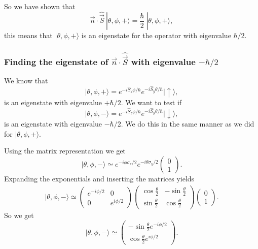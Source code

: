 \documentclass[a4paper, 11pt, titlepage, english]{article}
\newcommand{\ket}[1]{|#1 \rangle}
\newcommand{\op}[1]{\hat{#1}}
\newcommand{\up}{\left|\uparrow\rangle\right.}
\newcommand{\down}{\left|\downarrow\rangle\right.}
\begin{document}
So we have shown that
$$\vec{n}\cdot\op{\vec{S}} \ \ket{\theta, \phi, +} = \frac{\hbar}{2} \ \ket{\theta, \phi, +}, $$
this means that $\ket{\theta, \phi, +}$ is an eigenstate for the operator with eigenvalue $\hbar/2$.

\clearpage
\subsubsection*{Finding the eigenstate of $\vec{n}\cdot\op{\vec{S}}$ with eigenvalue $-\hbar/2$}
We know that 
$$\ket{\theta, \phi, +} = e^{-i\op{S}_z\phi/\hbar}e^{-i\op{S}_y\theta/\hbar}\up,$$
is an eigenstate with eigenvalue $+\hbar/2$. We want to test if
$$\ket{\theta, \phi, -} = e^{-i\op{S}_z\phi/\hbar}e^{-i\op{S}_y\theta/\hbar}\down,$$
is an eigenstate with eigenvalue $-\hbar/2$. We do this in the same manner as we did for $\ket{\theta, \phi, +}$.

Using the matrix representation we get
$$\ket{\theta, \phi, -} \simeq e^{-i\phi\sigma_z/2}e^{-i\theta\sigma_y/2}\begin{pmatrix} 0 \\ 1 \end{pmatrix}. $$
Expanding the exponentials and inserting the matrices yields
\begin{align*}
\ket{\theta, \phi, -} \simeq 
\begin{pmatrix}
e^{-i\phi/2} & 0 \\
0 & e^{i\phi/2}
\end{pmatrix}
\begin{pmatrix}
\cos\frac{\theta}{2} & -\sin\frac{\theta}{2} \\[0.4cm]
\sin\frac{\theta}{2} & \cos\frac{\theta}{2}
\end{pmatrix} 
\begin{pmatrix} 0 \\ 1 \end{pmatrix}.
\end{align*}
So we get
$$\ket{\theta, \phi, -} \simeq \begin{pmatrix}
-\sin\frac{\theta}{2}e^{-i\phi/2} \\[0.4cm]
 \cos{\frac{\theta}{2}}e^{i\phi/2}
\end{pmatrix}.$$
\end{document}
